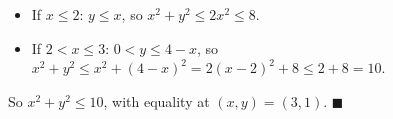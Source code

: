 \begin{itemize}
\item If $x\le2$: $y\le x$, so $x^2+y^2\le2x^2\le8$.
\item If $2<x\le3$: $0<y\le4-x$, so $x^2+y^2\le x^2+(4-x)^2=2(x-2)^2+8\le2+8=10$.
\end{itemize}
So $x^2+y^2\le10$, with equality at $(x,y)=(3,1)$. $\blacksquare$
